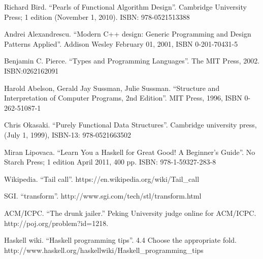 \documentclass{article}
\begin{document}

\begin{thebibliography}{99}

Richard Bird. ``Pearls of Functional Algorithm Design''. Cambridge University Press; 1 edition (November 1, 2010). ISBN: 978-0521513388

Andrei Alexandrescu. ``Modern C++ design: Generic Programming and Design Patterns Applied''. Addison Wesley February 01, 2001, ISBN 0-201-70431-5

Benjamin C. Pierce. ``Types and Programming Languages''. The MIT Press, 2002. ISBN:0262162091

Harold Abelson, Gerald Jay Sussman, Julie Sussman. ``Structure and Interpretation of Computer Programs, 2nd Edition''. MIT Press, 1996, ISBN 0-262-51087-1

Chris Okasaki. ``Purely Functional Data Structures''. Cambridge university press, (July 1, 1999), ISBN-13: 978-0521663502

Miran Lipovaca. ``Learn You a Haskell for Great Good! A Beginner's Guide''. No Starch Press; 1 edition April 2011, 400 pp. ISBN: 978-1-59327-283-8

Wikipedia. ``Tail call''. https://en.wikipedia.org/wiki/Tail\_call

SGI. ``transform''. http://www.sgi.com/tech/stl/transform.html

ACM/ICPC. ``The drunk jailer.'' Peking University judge online for ACM/ICPC. http://poj.org/problem?id=1218.

Haskell wiki. ``Haskell programming tips''. 4.4 Choose the appropriate fold. http://www.haskell.org/haskellwiki/Haskell\_programming\_tips

\end{thebibliography}

\ifx\wholebook\relax \else
\end{document}
